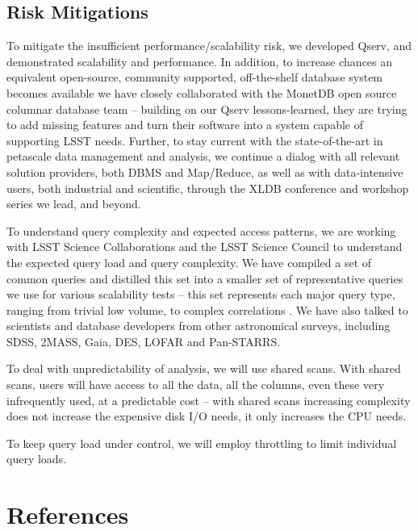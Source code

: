 \documentclass[DM,toc]{lsstdoc}
\begin{document}
\subsection{Risk Mitigations}\label{risk-mitigations}

To mitigate the insufficient performance/scalability risk, we developed Qserv,
and demonstrated scalability and performance. In addition, to increase chances
an equivalent open-source, community supported, off-the-shelf database system
becomes available we have closely collaborated with the MonetDB open source
columnar database team -- building on our Qserv lessons-learned, they are
trying to add missing features and turn their software into a system capable
of supporting LSST needs. Further, to stay current with the state-of-the-art
in petascale data management and analysis, we continue a dialog with all
relevant solution providers, both DBMS and Map/Reduce, as well as with data-intensive
users, both industrial and scientific, through the XLDB conference
and workshop series we lead, and beyond.

To understand query complexity and expected access patterns, we are
working with LSST Science Collaborations and the LSST Science Council to
understand the expected query load and query complexity. We have
compiled a set of common queries \citep{CommonQueries} and distilled
this set into a smaller set of representative queries we use for various
scalability tests -- this set represents each major query type, ranging
from trivial low volume, to complex correlations \citep{PerfTests}. We
have also talked to scientists and database developers from other
astronomical surveys, including SDSS, 2MASS, Gaia, DES, LOFAR and
Pan-STARRS.

To deal with unpredictability of analysis, we will use shared scans.
With shared scans, users will have access to all the data, all the
columns, even these very infrequently used, at a predictable cost --
with shared scans increasing complexity does not increase the expensive
disk I/O needs, it only increases the CPU needs.

To keep query load under control, we will employ throttling to limit
individual query loads.

\section{References}\label{references}
\renewcommand{\refname}{}

\end{document}
